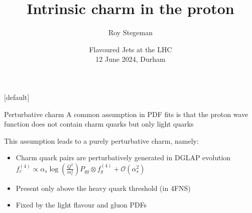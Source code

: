 \documentclass[aspectratio=43, 8pt,t]{beamer}
\title{Intrinsic charm in the proton}
\date{Flavoured Jets at the LHC  \\[0.1cm] 12 June 2024, Durham}
\author{Roy Stegeman}
\institute{\small The University of Edinburgh}
\begin{document}
{
\begin{frame}
  \titlepage
\end{frame}
}

[default]



\newcommand{\nn}{\vspace*{1em}}












\begin{frame}{Perturbative charm}
  A common assumption in PDF fits is that the proton wave function does not contain charm quarks but only light quarks

  \vspace*{1em}
  This assumption leads to a purely perturbative charm, namely:
  \begin{itemize}
    \item Charm quark pairs are perturbatively generated in DGLAP evolution\\
    $f_c^{(4)}\propto \alpha_s \log\left(\frac{Q^2}{m_c^2}\right)P_{qg} \otimes f_g^{(4)} + \mathcal{O}(\alpha_s^2)$

    \item Present only above the heavy quark threshold (in 4FNS)

    \item Fixed by the light flavour and gluon PDFs
  \end{itemize}

  \vspace*{1em}
\end{frame}
\end{document}

